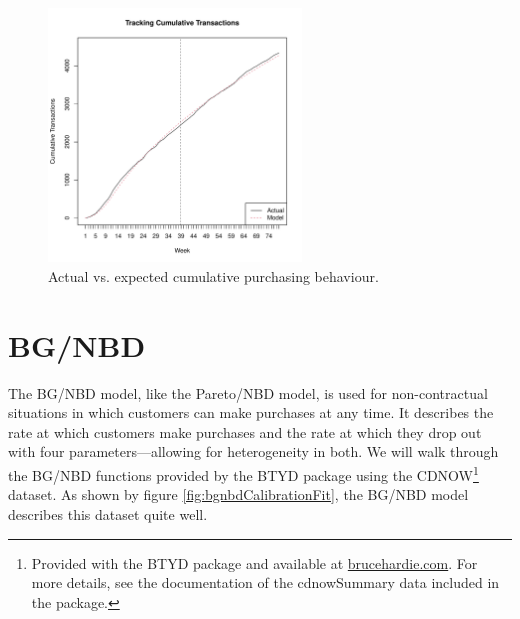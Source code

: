 \documentclass[10pt, letterpaper, onecolumn, oneside, final]{article}\usepackage[]{graphicx}\usepackage[]{color}
\begin{document}
\begin{figure}
  \begin{center}
  \includegraphics[width=0.6\textwidth]{figure/pnbdTrackingCum}
  \caption{Actual vs. expected cumulative purchasing behaviour.}\label{fig:pnbdTrackingCum}
  \end{center}
\end{figure}









\section{BG/NBD}

The BG/NBD model, like the Pareto/NBD model, is used for non-contractual 
situations in which customers can make purchases at any time. It
describes the rate at which customers make purchases and the rate at
which they drop out with four parameters---allowing for heterogeneity in both. 
We will walk through the BG/NBD functions provided by the BTYD package using the 
CDNOW\footnote{Provided with
  the BTYD package and available at
  \href{http://www.brucehardie.com}{brucehardie.com}. For more
  details, see the documentation of the cdnowSummary data included in
  the package.} dataset. As shown by
figure \ref{fig:bgnbdCalibrationFit}, the BG/NBD model describes
this dataset quite well.
\end{document}
